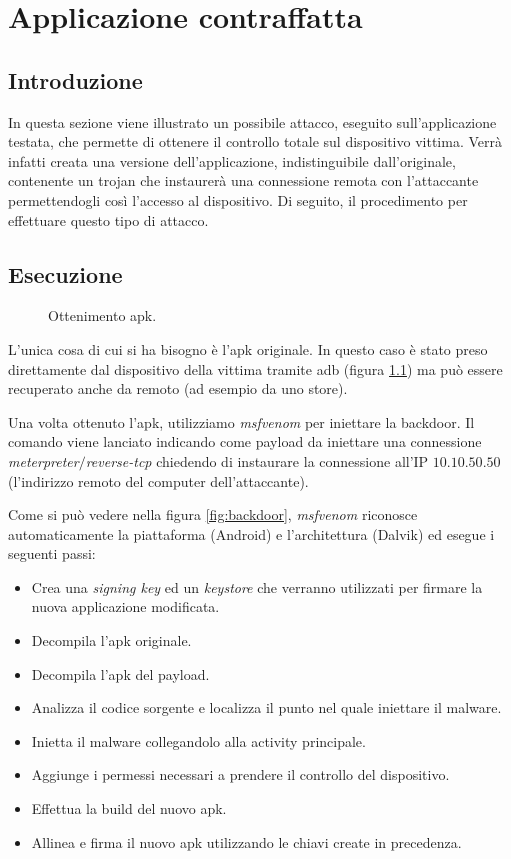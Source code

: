 \chapter{Applicazione contraffatta}

\section{Introduzione}

In questa sezione viene illustrato un possibile attacco, eseguito sull'applicazione testata, che permette di ottenere il controllo totale sul dispositivo vittima. Verrà infatti creata una versione dell'applicazione, indistinguibile dall'originale, contenente un trojan che instaurerà una connessione remota con l'attaccante permettendogli così l'accesso al dispositivo. Di seguito, il procedimento per effettuare questo tipo di attacco.

\section{Esecuzione}

\begin{figure}[h]
	\centering
	\caption{Ottenimento apk.}
	\label{fig:apk}
\end{figure}

L'unica cosa di cui si ha bisogno è l'apk originale. In questo caso è stato preso direttamente dal dispositivo della vittima tramite adb (figura \ref{fig:apk}) ma può essere recuperato anche da remoto (ad esempio da uno store).

Una volta ottenuto l'apk, utilizziamo \emph{msfvenom}\cite{MSFVenom} per iniettare la backdoor. Il comando viene lanciato indicando come payload da iniettare una connessione \emph{meterpreter}$/$\emph{reverse-tcp} chiedendo di instaurare la connessione all'IP $10.10.50.50$ (l'indirizzo remoto del computer dell'attaccante).

Come si può vedere nella figura \ref{fig:backdoor}, \emph{msfvenom} riconosce automaticamente la piattaforma (Android) e l'architettura (Dalvik) ed esegue i seguenti passi:

\begin{itemize}
	\item Crea una \emph{signing key} ed un \emph{keystore} che verranno utilizzati per firmare la nuova applicazione modificata.
	\item Decompila l'apk originale.
	\item Decompila l'apk del payload.
	\item Analizza il codice sorgente e localizza il punto nel quale iniettare il malware.
	\item Inietta il malware collegandolo alla activity principale.
	\item Aggiunge i permessi necessari a prendere il controllo del dispositivo.
	\item Effettua la build del nuovo apk.
	\item Allinea e firma il nuovo apk utilizzando le chiavi create in precedenza.
\end{itemize}

